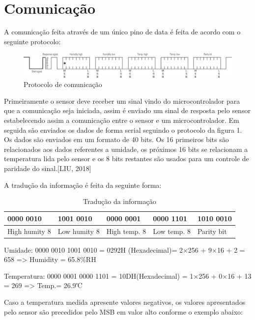 \section{Comunicação}

A comunicação feita através de um único pino de data é feita de acordo com o seguinte protocolo:

\begin{figure}[H]
	\centering
	\includegraphics[width=16cm]{figuras/single_bus.jpg}
	\caption{Protocolo de comunicação} 
	\label{single_bus}
\end{figure}

Primeiramente o sensor deve receber um sinal vindo do microcontrolador para que a comunicação seja iniciada, assim é enviado um sinal de resposta pelo sensor estabelecendo assim a comunicação entre o sensor e um microcontrolador. Em seguida são enviados os dados de forma serial seguindo o protocolo da figura 1. Os  dados são enviados em um formato de 40 bits. Os 16 primeiros bits são relacionados aos dados referentes a umidade, os próximos 16 bits se relacionam a temperatura lida pelo sensor e os 8 bits restantes são usados para um controle de paridade do sinal\cite{liu2018}.[LIU, 2018]

A tradução da informação é feita da seguinte forma:

\begin{table}[H]
	\centering
	\caption{Tradução da informação}
	\label{my-label}
	\begin{tabular}{|l|l|l|l|l|}
		\hline
		{0000 0010} & {1001 0010} & {0000 0001} & {0000 1101} & {1010 0010} \\ \hline
		High humity 8   & Low humity 8    & High temp. 8    & Low temp. 8     & Parity bit      \\ \hline
	\end{tabular}
\end{table}


Umidade: 0000 0010  1001 0010 = 0292H (Hexadecimal)= 2×256 + 9×16 + 2 = 658    => Humidity = 65.8\%RH

Temperatura: 0000 0001  0000 1101 = 10DH(Hexadecimal) = 1×256 + 0×16 + 13 = 269   => Temp.= 26.9℃ 

Caso a temperatura medida apresente valores negativos, os valores apresentados pelo sensor são precedidos pelo MSB em valor alto conforme o exemplo abaixo:

